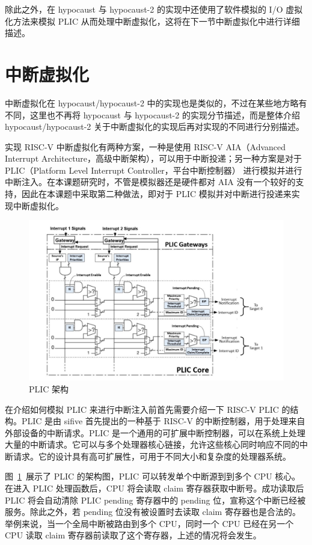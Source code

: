 除此之外，在 hypocaust 与 hypocaust-2 的实现中还使用了软件模拟的 I/O 虚拟化方法来模拟 PLIC 从而处理中断虚拟化，这将在下一节中断虚拟化中进行详细描述。

\section{中断虚拟化}
中断虚拟化在 hypocaust/hypocaust-2 中的实现也是类似的，不过在某些地方略有不同，这里也不再将 hypocaust 与 hypocaust-2 的实现分节描述，而是整体介绍 hypocaust/hypocaust-2 关于中断虚拟化的实现后再对实现的不同进行分别描述。

实现 RISC-V 中断虚拟化有两种方案，一种是使用 RISC-V AIA（Advanced Interrupt Architecture，高级中断架构）\cite{riscv-aia}，可以用于中断投递；另一种方案是对于 PLIC（Platform Level Interrupt Controller，平台中断控制器） 进行模拟并进行中断注入\cite{riscv-plic}。在本课题研究时，不管是模拟器还是硬件都对 AIA 没有一个较好的支持，因此在本课题中采取第二种做法，即对于 PLIC 模拟并对中断进行投递来实现中断虚拟化。

\begin{figure}[]
    \centering
    \includegraphics[width=1\textwidth]{thesis-images/PLIC.jpeg}
    \caption{PLIC 架构\cite{riscv-plic}}\label{fig:PLIC}
\end{figure}

在介绍如何模拟 PLIC 来进行中断注入前首先需要介绍一下 RISC-V PLIC 的结构。PLIC 是由 sifive 首先提出的一种基于 RISC-V 的中断控制器，用于处理来自外部设备的中断请求。PLIC 是一个通用的可扩展中断控制器，可以在系统上处理大量的中断请求。它可以与多个处理器核心链接，允许这些核心同时响应不同的中断请求。它的设计具有高可扩展性，可用于不同大小和复杂度的处理器系统。

图~\ref{fig:PLIC}~展示了 PLIC 的架构图，PLIC 可以转发单个中断源到到多个 CPU 核心。在进入 PLIC 处理函数后，CPU 将会读取 claim 寄存器获取中断号。成功读取后 PLIC 将会自动清除 PLIC pending 寄存器中的 pending 位，宣称这个中断已经被服务。除此之外，若 pending 位没有被设置时去读取 claim 寄存器也是合法的。举例来说，当一个全局中断被路由到多个 CPU，同时一个 CPU 已经在另一个 CPU 读取 claim 寄存器前读取了这个寄存器，上述的情况将会发生。

